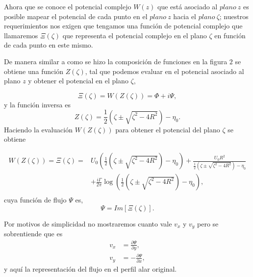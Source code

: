 \documentclass[portrait]{Hylangtechposter}
\begin{document}
\begin{multicols}{2}
\noindent Ahora que se conoce el potencial complejo $W(z)$ que está asociado al $plano \: z$ es posible mapear el potencial de cada punto en el $plano \: z$ hacia el $plano \: \zeta$; nuestros requerimientos nos exigen que tengamos una función de potencial complejo que llamaremos $\Xi(\zeta)$ que representa el potencial complejo en el plano $\zeta$ en función de cada punto en este mismo.
			
			De manera similar a como se hizo la composición de funciones en la figura $2$ se obtiene una función $Z(\zeta)$, tal que podemos evaluar en el potencial asociado al plano $z$ y obtener el potencial en el plano $\zeta$,

			\begin{equation*}
				\Xi(\zeta)= W(Z(\zeta))	= \Phi +i \Psi,			
			\end{equation*}
			y la función inversa es
			\begin{equation*}
				Z(\zeta)= \frac{1}{2}\left(\zeta \pm  \sqrt{\zeta^2 -4R^2} \right) - \eta_0 . 
			\end{equation*}
			Haciendo la evaluación $W(Z(\zeta))$ para obtener el potencial del plano $\zeta$ se obtiene
			
			\begin{equation}
				\begin{split}
					W(Z(\zeta)) = \Xi(\zeta) =& U_0 \left( \frac{1}{2}\left(\zeta \pm  \sqrt{\zeta^2 -4R^2} \right) - \eta_0\right) + \frac{ U_0R^2}{\frac{1}{2}\left(\zeta \pm  \sqrt{\zeta^2 -4R^2} \right) - \eta_0}\\ 
					&+ \frac{i \Gamma}{2 \pi}\log \left(\frac{1}{2}\left(\zeta \pm  \sqrt{\zeta^2 -4R^2} \right) - \eta_0\right),\\
				\end{split}	
			\end{equation}
			cuya función de flujo $\Psi $ es,
			\begin{equation*}
				\Psi=Im[\Xi(\zeta)] .
			\end{equation*}
			
			\noindent Por motivos de simplicidad no mostraremos cuanto vale $v_x$ y $v_y$ pero se sobrentiende que es
			\begin{equation*}
				\begin{split}
					v_x &= \frac{\partial \Psi }{\partial y},\\
					v_y &= -\frac{\partial \Psi }{\partial x},
				\end{split}
			\end{equation*}
			y aquí la representación del flujo en el perfil alar original.


\end{multicols}
\end{document}
